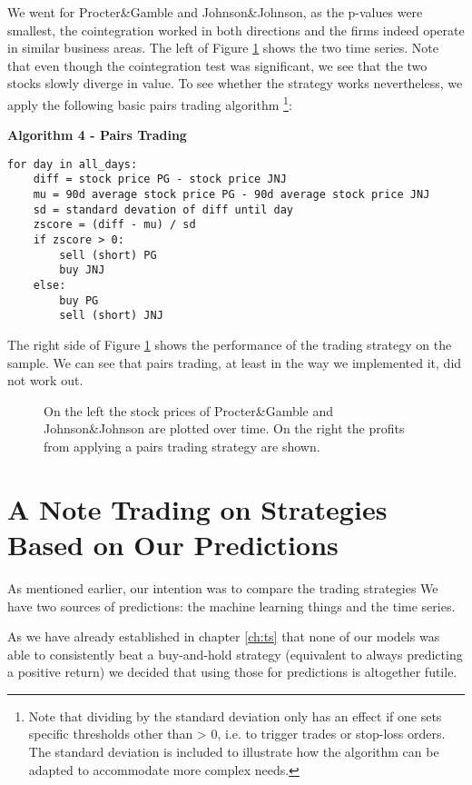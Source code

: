 We went for Procter\&Gamble and Johnson\&Johnson, as the p-values were smallest, the cointegration worked in both directions and the firms indeed operate in similar business areas. The left of Figure \ref{fig:coint_PG_JNJ} shows the two time series. Note that even though the cointegration test was significant, we see that the two stocks slowly diverge in value. To see whether the strategy works nevertheless, we apply the following basic pairs trading algorithm \footnote{Note that dividing by the standard deviation only has an effect if one sets specific thresholds other than > 0, i.e. to trigger trades or stop-loss orders. The standard deviation is included to illustrate how the algorithm can be adapted to accommodate more complex needs.}: 

\vspace{2ex}
\textbf{\small{Algorithm 4 - Pairs Trading}}
\vspace{-1ex}
\begin{verbatim}
for day in all_days: 
    diff = stock price PG - stock price JNJ
    mu = 90d average stock price PG - 90d average stock price JNJ
    sd = standard devation of diff until day
    zscore = (diff - mu) / sd
    if zscore > 0:
        sell (short) PG
        buy JNJ
    else:
        buy PG
        sell (short) JNJ
\end{verbatim}

The right side of Figure \ref{fig:coint_PG_JNJ} shows the performance of the trading strategy on the sample. We can see that pairs trading, at least in the way we implemented it, did not work out. 

\begin{figure}[h!]
    \centering
    \begin{adjustbox}{width=.95\textwidth,center}
        
        
    \end{adjustbox}  
    \caption{On the left the stock prices of Procter\&Gamble and Johnson\&Johnson are plotted over time. On the right the profits from applying a pairs trading strategy are shown.}
    \label{fig:coint_PG_JNJ}
\end{figure}{}

\section{A Note Trading on Strategies Based on Our Predictions}
As mentioned earlier, our intention was to compare the trading strategies 
We have two sources of predictions: the machine learning things and the time series. 

As we have already established in chapter \ref{ch:ts} that none of our models was able to consistently beat a buy-and-hold strategy (equivalent to always predicting a positive return) we decided that using those for predictions is altogether futile. 




